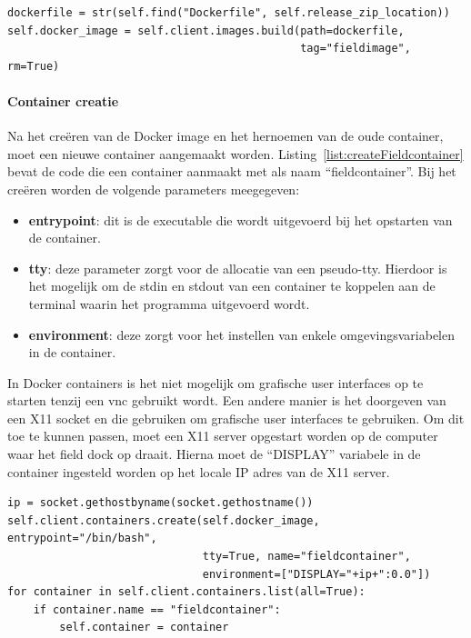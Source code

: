 \begin{minipage}{\linewidth}
\begin{center}
\begin{lstlisting}[captionpos=b,caption={Creatie van een Docker image},label={list:createImage}]
dockerfile = str(self.find("Dockerfile", self.release_zip_location))
self.docker_image = self.client.images.build(path=dockerfile,
                                             tag="fieldimage", rm=True)
\end{lstlisting}
\end{center}
\end{minipage}


\paragraph{Container creatie}
Na het creëren van de Docker image en het hernoemen van de oude container, moet een nieuwe container aangemaakt worden.
Listing~\ref{list:createFieldcontainer} bevat de code die een container aanmaakt met als naam ``fieldcontainer''.
Bij het creëren worden de volgende parameters meegegeven:
\begin{itemize}
\item \textbf{entrypoint}: dit is de executable die wordt uitgevoerd bij het opstarten van de container.
\item \textbf{tty}: deze parameter zorgt voor de allocatie van een pseudo-tty. 
Hierdoor is het mogelijk om de stdin en stdout van een container te koppelen aan de terminal waarin het programma uitgevoerd wordt.
\item \textbf{environment}: deze zorgt voor het instellen van enkele omgevingsvariabelen in de container.
\end{itemize}
In Docker containers is het niet mogelijk om grafische user interfaces op te starten tenzij een vnc gebruikt wordt.
Een andere manier is het doorgeven van een X11 socket en die gebruiken om grafische user interfaces te gebruiken.
Om dit toe te kunnen passen, moet een X11 server opgestart worden op de computer waar het field dock op draait.
Hierna moet de ``DISPLAY'' variabele in de container ingesteld worden op het locale IP adres van de X11 server.

\begin{minipage}{\linewidth}
\begin{center}
\begin{lstlisting}[captionpos=b,caption={Creatie van fieldcontainer},label={list:createFieldcontainer}]
ip = socket.gethostbyname(socket.gethostname())
self.client.containers.create(self.docker_image, entrypoint="/bin/bash",
                              tty=True, name="fieldcontainer",
                              environment=["DISPLAY="+ip+":0.0"])
for container in self.client.containers.list(all=True):
    if container.name == "fieldcontainer":
        self.container = container
\end{lstlisting}
\end{center}
\end{minipage}

